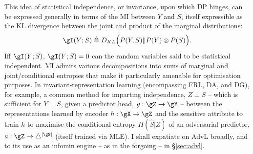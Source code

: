 This idea of statistical independence, or invariance, upon which \ac{DP} hinges, can be expressed
generally in terms of the \acf{MI} between \(Y\) and \(S\), itself expressible as the KL divergence
between the joint and product of the marginal distributions:
%
\begin{equation}
    \gI(Y;S) \triangleq D_{KL} \Bigl( P(Y, S) \Vert P(Y) \otimes P(S) \Bigr).
\end{equation}
%
Iff \( \gI(Y;S)\), \( \gI(Y;S) = 0  \) can the random variables said to be statistical independent.
%
%
\ac{MI} admits various decompositions into sums of marginal and joint/conditional entropies that
make it particularly amenable for optimisation purposes. 
%
In invariant-representation learning (encompassing \ac{FRL}, \ac{DA}, and \ac{DG}), for example, a
common method for imparting independence, \(Z \perp S \) -- which is sufficient for \(Y \perp S\),
given a predictor head, \(g: \gZ \to \gY \) -- between the representations learned by encoder \(h:
\gX \to \gZ \) and the sensitive attribute to train \(h\) to maximise the conditional entropy \(
H(\hat{S}|Z) \) of an adversarial predictor, \(a: \gZ \to \bigtriangleup^{|\gS|}\) (itself trained
via \ac{MLE}).
%
I shall expatiate on \ac{AdvL} broadly, and \wrt{} to its use as an infomin engine -- as in the
forgoing -- in \S\ref{sec:advl}.

